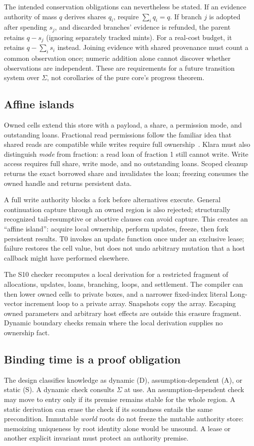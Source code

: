 \documentclass[acmsmall,screen,review,nonacm]{acmart}
\begin{document}
The intended conservation obligations can nevertheless be stated. If an
evidence authority of mass $q$ derives shares $q_i$, require
$\sum_iq_i=q$. If branch $j$ is adopted after spending $s_j$, and discarded
branches' evidence is refunded, the parent retains $q-s_j$ (ignoring separately
tracked mints). For a real-cost budget, it retains $q-\sum_i s_i$ instead.
Joining evidence with shared provenance must count a common observation once;
numeric addition alone cannot discover whether observations are independent.
These are requirements for a future transition system over $\Sigma$, not
corollaries of the pure core's progress theorem.

\subsection{Affine islands}
Owned cells extend this store with a payload, a share, a permission mode, and
outstanding loans. Fractional read permissions follow the familiar idea that
shared reads are compatible while writes require full ownership~\cite{boyland2003}.
Klara must also distinguish \emph{mode} from fraction: a read loan of fraction
1 still cannot write. Write access requires full share, write mode, and no
outstanding loans. Scoped cleanup returns the exact borrowed share and
invalidates the loan; freezing consumes the owned handle and returns persistent
data.

A full write authority blocks a fork before alternatives execute. General
continuation capture through an owned region is also rejected; structurally
recognized tail-resumptive or abortive clauses can avoid capture. This creates
an ``affine island'': acquire local ownership, perform updates, freeze, then
fork persistent results. T0 invokes an update function once under an exclusive
lease; failure restores the cell value, but does not undo arbitrary mutation
that a host callback might have performed elsewhere.

The S10 checker recomputes a local derivation for a restricted fragment of
allocations, updates, loans, branching, loops, and settlement. The compiler can
then lower owned cells to private boxes, and a narrower fixed-index literal
Long-vector increment loop to a private array. Snapshots copy the array.
Escaping owned parameters and arbitrary host effects are outside this erasure
fragment. Dynamic boundary checks remain where the local derivation supplies
no ownership fact.

\subsection{Binding time is a proof obligation}
The design classifies knowledge as dynamic (D), assumption-dependent (A), or
static (S). A dynamic check consults $\Sigma$ at use. An assumption-dependent
check may move to entry only if its premise remains stable for the whole
region. A static derivation can erase the check if its soundness entails the
same precondition. Immutable \emph{world} roots do not freeze the mutable
authority store: memoizing uniqueness by root identity alone would be unsound.
A lease or another explicit invariant must protect an authority premise.
\end{document}
